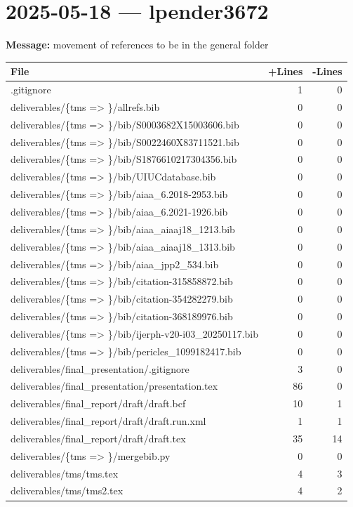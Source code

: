 \documentclass{article}
\begin{document}
\section*{2025-05-18 --- lpender3672}
\textbf{Message:} movement of references to be in the general folder

\begin{longtable}{|p{10cm}|r|r|}
\hline \textbf{File} & \textbf{+Lines} & \textbf{-Lines} \\
\hline
.gitignore & 1 & 0 \\
\hline
deliverables/\{tms => \}/allrefs.bib & 0 & 0 \\
\hline
deliverables/\{tms => \}/bib/S0003682X15003606.bib & 0 & 0 \\
\hline
deliverables/\{tms => \}/bib/S0022460X83711521.bib & 0 & 0 \\
\hline
deliverables/\{tms => \}/bib/S1876610217304356.bib & 0 & 0 \\
\hline
deliverables/\{tms => \}/bib/UIUCdatabase.bib & 0 & 0 \\
\hline
deliverables/\{tms => \}/bib/aiaa\_6.2018-2953.bib & 0 & 0 \\
\hline
deliverables/\{tms => \}/bib/aiaa\_6.2021-1926.bib & 0 & 0 \\
\hline
deliverables/\{tms => \}/bib/aiaa\_aiaaj18\_1213.bib & 0 & 0 \\
\hline
deliverables/\{tms => \}/bib/aiaa\_aiaaj18\_1313.bib & 0 & 0 \\
\hline
deliverables/\{tms => \}/bib/aiaa\_jpp2\_534.bib & 0 & 0 \\
\hline
deliverables/\{tms => \}/bib/citation-315858872.bib & 0 & 0 \\
\hline
deliverables/\{tms => \}/bib/citation-354282279.bib & 0 & 0 \\
\hline
deliverables/\{tms => \}/bib/citation-368189976.bib & 0 & 0 \\
\hline
deliverables/\{tms => \}/bib/ijerph-v20-i03\_20250117.bib & 0 & 0 \\
\hline
deliverables/\{tms => \}/bib/pericles\_1099182417.bib & 0 & 0 \\
\hline
deliverables/final\_presentation/.gitignore & 3 & 0 \\
\hline
deliverables/final\_presentation/presentation.tex & 86 & 0 \\
\hline
deliverables/final\_report/draft/draft.bcf & 10 & 1 \\
\hline
deliverables/final\_report/draft/draft.run.xml & 1 & 1 \\
\hline
deliverables/final\_report/draft/draft.tex & 35 & 14 \\
\hline
deliverables/\{tms => \}/mergebib.py & 0 & 0 \\
\hline
deliverables/tms/tms.tex & 4 & 3 \\
\hline
deliverables/tms/tms2.tex & 4 & 2 \\
\hline
\end{longtable}
\end{document}
